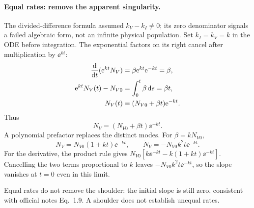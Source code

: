 \paragraph{Equal rates: remove the apparent singularity.}
The divided-difference formula assumed $k_V-k_I\ne0$; its zero denominator signals a failed algebraic form, not an infinite physical population. Set $k_I=k_V=k$ in the ODE before integration. The exponential factors on its right cancel after multiplication by $\ee^{kt}$:
\begin{align}
\frac{\mathrm{d}}{\mathrm{d} t}(\mathrm{e}^{kt}N_V)&=\beta\mathrm{e}^{kt}\mathrm{e}^{-kt}=\beta,\notag\\
\mathrm{e}^{kt}N_V(t)-N_{V0}&=\int_0^t\beta\,\mathrm{d} s=\beta t,\notag\\
N_V(t)&=(N_{V0}+\beta t)\mathrm{e}^{-kt}.\label{eq:equal-rate-integration}
\end{align}
Thus
\begin{equation}\label{eq:equal-rate-general}
\boxed{N_V=(N_{V0}+\beta t)\ee^{-kt}.}
\end{equation}
A polynomial prefactor replaces the distinct modes. For $\beta=kN_{V0}$,
\begin{equation}\label{eq:equal-rate-steady}
N_V=N_{V0}(1+kt)\ee^{-kt},\qquad
\dot N_V=-N_{V0}k^2t\ee^{-kt}.
\end{equation}
For the derivative, the product rule gives $N_{V0}[k\ee^{-kt}-k(1+kt)\ee^{-kt}]$. Cancelling the two terms proportional to $k$ leaves $-N_{V0}k^2t\ee^{-kt}$, so the slope vanishes at $t=0$ even in this limit.
\begin{remark}
Equal rates do not remove the shoulder: the initial slope is still zero, consistent with official notes Eq.~1.9. A shoulder does not establish unequal rates.
\end{remark}

